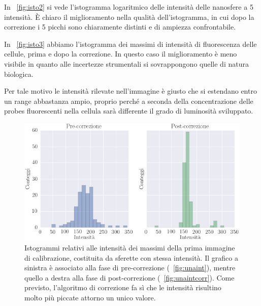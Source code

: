 In \figurename~\ref{fig:isto2} si vede l'istogramma logaritmico delle intensità delle nanosfere a 5 intensità. 
È chiaro il miglioramento nella qualità dell'istogramma, in cui dopo la correzione i 5 picchi sono chiaramente distinti e di ampiezza confrontabile.

In \figurename~\ref{fig:isto3} abbiamo l'istogramma dei massimi di intensità di fluorescenza delle cellule, prima e dopo la correzione.
In questo caso il miglioramento è meno visibile in quanto alle incertezze strumentali si sovrappongono quelle di natura biologica.

Per tale motivo le intensità rilevate nell'immagine è giusto che si estendano entro un range abbastanza ampio, proprio perché a seconda della concentrazione delle probes fluorescenti nella cellula sarà differente il grado di luminosità sviluppato.

\begin{figure}
 \centering
 \includegraphics[scale=.55]{img/CAP4isto1.png}
 \caption{\small{Istogrammi relativi alle intensità dei massimi della prima immagine di calibrazione, costituita da sferette con stessa intensità. Il grafico a sinistra è associato alla fase di pre-correzione (\figurename~\ref{fig:unaint}), mentre quello a destra alla fase di post-correzione (\figurename~\ref{fig:unaintcorr}). Come previsto, l'algoritmo di correzione fa sì che le intensità risultino molto più piccate attorno un unico valore.}}
 \label{fig:isto1}
\end{figure}

